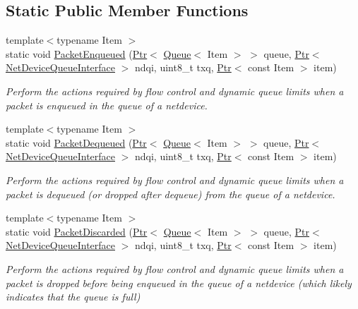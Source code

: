 \subsection*{Static Public Member Functions}
\begin{DoxyCompactItemize}
\item 
{\footnotesize template$<$typename Item $>$ }\\static void \hyperlink{classns3_1_1NetDeviceQueue_aada25000d7564442eec5853d84729c6a}{Packet\+Enqueued} (\hyperlink{classns3_1_1Ptr}{Ptr}$<$ \hyperlink{classns3_1_1Queue}{Queue}$<$ Item $>$ $>$ queue, \hyperlink{classns3_1_1Ptr}{Ptr}$<$ \hyperlink{classns3_1_1NetDeviceQueueInterface}{Net\+Device\+Queue\+Interface} $>$ ndqi, uint8\+\_\+t txq, \hyperlink{classns3_1_1Ptr}{Ptr}$<$ const Item $>$ item)
\begin{DoxyCompactList}\small\item\em Perform the actions required by flow control and dynamic queue limits when a packet is enqueued in the queue of a netdevice. \end{DoxyCompactList}\item 
{\footnotesize template$<$typename Item $>$ }\\static void \hyperlink{classns3_1_1NetDeviceQueue_a406572ce308f6e0bf59a60abcc8e73e5}{Packet\+Dequeued} (\hyperlink{classns3_1_1Ptr}{Ptr}$<$ \hyperlink{classns3_1_1Queue}{Queue}$<$ Item $>$ $>$ queue, \hyperlink{classns3_1_1Ptr}{Ptr}$<$ \hyperlink{classns3_1_1NetDeviceQueueInterface}{Net\+Device\+Queue\+Interface} $>$ ndqi, uint8\+\_\+t txq, \hyperlink{classns3_1_1Ptr}{Ptr}$<$ const Item $>$ item)
\begin{DoxyCompactList}\small\item\em Perform the actions required by flow control and dynamic queue limits when a packet is dequeued (or dropped after dequeue) from the queue of a netdevice. \end{DoxyCompactList}\item 
{\footnotesize template$<$typename Item $>$ }\\static void \hyperlink{classns3_1_1NetDeviceQueue_a0f6712b277a48d3f482f21b3176b765e}{Packet\+Discarded} (\hyperlink{classns3_1_1Ptr}{Ptr}$<$ \hyperlink{classns3_1_1Queue}{Queue}$<$ Item $>$ $>$ queue, \hyperlink{classns3_1_1Ptr}{Ptr}$<$ \hyperlink{classns3_1_1NetDeviceQueueInterface}{Net\+Device\+Queue\+Interface} $>$ ndqi, uint8\+\_\+t txq, \hyperlink{classns3_1_1Ptr}{Ptr}$<$ const Item $>$ item)
\begin{DoxyCompactList}\small\item\em Perform the actions required by flow control and dynamic queue limits when a packet is dropped before being enqueued in the queue of a netdevice (which likely indicates that the queue is full) \end{DoxyCompactList}\end{DoxyCompactItemize}

